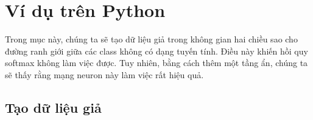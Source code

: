  
 
 
 
\section{Ví dụ trên Python}
 
 

Trong mục này, chúng ta sẽ tạo dữ liệu giả trong không gian hai chiều sao cho
đường ranh giới giữa các class {không} có dạng tuyến tính. Điều này khiến hồi
quy softmax không làm việc được. Tuy nhiên, bằng cách thêm một tầng ẩn, chúng ta
sẽ thấy rằng mạng neuron này làm việc rất hiệu quả.
 
\subsection{Tạo dữ liệu giả}
 
 
 
 
 
 

